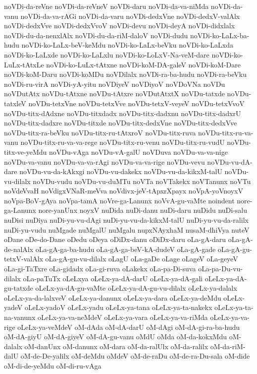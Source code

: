 {noVDi-da-reVne
noVDi-da-reVneV
noVDi-daru
noVDi-da-va-niMda
noVDi-da-vanu
noVDi-da-va-rAGi
noVDi-da-varu
noVDi-dedxVne
noVDi-dedxV-valAlx
noVDi-dedxVve
noVDi-dedxVvoV
noVDi-devu
noVDi-deyA
noVDi-didxlalx
noVDi-du-da-nenxlAlx
noVDi-du-da-riM-daloV
noVDi-dudu
noVDi-ko-LaLx-ba-hudu
noVDi-ko-LaLx-beV-keMdu
noVDi-ko-LaLx-beVku
noVDi-ko-LaLxda
noVDi-ko-LaLxde
noVDi-ko-LaLxlu
noVDi-ko-LoLxV-Na-veM-dare
noVDi-ko-LuLx-tAtxLe
noVDi-ko-LuLx-tAtxne
noVDi-koM-DA-galeV
noVDi-koM-Dare
noVDi-koM-Daru
noVDi-koMDu
noVDilalx
noVDi-ra-ba-hudu
noVDi-ra-beVku
noVDi-ru-virA
noVDi-yA-yitu
noVDiyeV
noVDiyoV
noVDoVNa
noVDu
noVDutAtx
noVDu-tAtxne
noVDu-tAtxre
noVDutAtxtX
noVDu-tatxde
noVDu-tatxleV
noVDu-tetxVne
noVDu-tetxVve
noVDu-tetxV-veyeV
noVDu-tetxVvoV
noVDu-titx-dAdxne
noVDu-titxdadx
noVDu-titx-dadxnu
noVDu-titx-dadxrU
noVDu-titx-dadxre
noVDu-titxde
noVDu-titx-dedxVne
noVDu-titx-dedxVve
noVDu-titx-ra-beVku
noVDu-titx-ru-tAtxroV
noVDu-titx-ruva
noVDu-titx-ru-va-vanu
noVDu-titx-ru-va-va-rege
noVDu-titx-ru-venu
noVDu-titx-ru-vudU
noVDu-titx-ve-yeMdu
noVDu-vAga
noVDu-vA-galU
noVDuva
noVDu-va-va-nige
noVDu-va-vanu
noVDu-va-va-rAgi
noVDu-va-va-rige
noVDu-vevu
noVDu-vu-dA-dare
noVDu-vu-da-kAkxgi
noVDu-vu-dakekx
noVDu-vu-da-kikxM-talU
noVDu-vu-dilalx
noVDu-vudu
noVDu-vu-duMTu
noVTa
noVTakekx
noVTanunx
noVTu
noVdeVvaH
noVdigxVNaR-meVva
noVdivx-jeV-tApxrXpayx
noVpA-yoVnoyxV
noVpa-BoV-gAya
noVpa-tamA
noVre-ga-Lanunx
noVvA-gu-vaMte
noindent
nore-ga-Lanunx
nore-yanUnx
noyxV
nuDida
nuDi-danu
nuDi-daru
nuDidu
nuDi-salu
nuDisi
nuDiya
nuDi-yu-vu-dAgi
nuDi-yu-vu-da-kikxM-talU
nuDi-yu-vu-da-ralilx
nuDi-yu-vudu
nuMgade
nuMgalU
nuMgalu
nupxNAyxhaM
nusaM-dhiVya
nuteV
oDane
oDe-do-Dane
oDedu
oDeya
oDiDx-danu
oDiDx-daru
oLa-gA-daru
oLa-gA-de-nalAlx
oLa-gA-ga-ba-hudu
oLa-gA-ga-beV-kA-dudeV
oLa-gA-gade
oLa-gA-gu-tetxV-valAlx
oLa-gA-gu-vu-dilalx
oLagU
oLa-gaDe
oLage
oLageV
oLa-geyeV
oLa-gi-TaTxre
oLa-gidadx
oLa-gi-ruva
oLakekx
oLa-pa-Di-suva
oLa-pa-Du-vu-dilalx
oLa-paTuTx
oLeLxya
oLeLx-ya-dA-darU
oLeLx-ya-dA-gali
oLeLx-ya-dA-gu-tatxde
oLeLx-ya-dA-gu-vaMte
oLeLx-ya-dA-gu-vu-dilalx
oLeLx-ya-dalalx
oLeLx-ya-da-lalxveV
oLeLx-ya-danunx
oLeLx-ya-dara
oLeLx-ya-deMdu
oLeLx-yadeV
oLeLx-yadoV
oLeLx-yadu
oLeLx-ya-tana
oLeLx-ya-ta-nakekx
oLeLx-ya-ta-na-vanunx
oLeLx-ya-va-neMdeV
oLeLx-ya-vara
oLeLx-ya-va-riMda
oLeLx-ya-va-rige
oLeLx-ya-veMdeV
oM-dAda
oM-dA-darU
oM-dAgi
oM-dA-gi-ra-ba-hudu
oM-dA-giyU
oM-dA-giyeV
oM-dA-gu-vanu
oMdU
oMda
oM-da-kokxMdu
oM-dalalx
oM-danUnx
oM-danunx
oM-dara
oM-da-ralUlx
oM-da-ralilx
oM-da-riM-dalU
oM-de-De-yalilx
oM-deMdu
oMdeV
oM-de-raDu
oM-de-ra-Du-sala
oM-dide
oM-di-de-yeMdu
oM-di-ru-vAga
}

